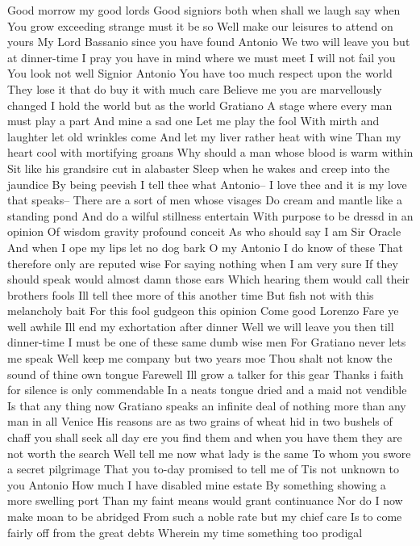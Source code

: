 Good morrow my good lords
Good signiors both when shall we laugh say when
You grow exceeding strange must it be so
Well make our leisures to attend on yours
My Lord Bassanio since you have found Antonio
We two will leave you but at dinner-time
I pray you have in mind where we must meet
I will not fail you
You look not well Signior Antonio
You have too much respect upon the world
They lose it that do buy it with much care
Believe me you are marvellously changed
I hold the world but as the world Gratiano
A stage where every man must play a part
And mine a sad one
Let me play the fool
With mirth and laughter let old wrinkles come
And let my liver rather heat with wine
Than my heart cool with mortifying groans
Why should a man whose blood is warm within
Sit like his grandsire cut in alabaster
Sleep when he wakes and creep into the jaundice
By being peevish I tell thee what Antonio--
I love thee and it is my love that speaks--
There are a sort of men whose visages
Do cream and mantle like a standing pond
And do a wilful stillness entertain
With purpose to be dressd in an opinion
Of wisdom gravity profound conceit
As who should say I am Sir Oracle
And when I ope my lips let no dog bark
O my Antonio I do know of these
That therefore only are reputed wise
For saying nothing when I am very sure
If they should speak would almost damn those ears
Which hearing them would call their brothers fools
Ill tell thee more of this another time
But fish not with this melancholy bait
For this fool gudgeon this opinion
Come good Lorenzo Fare ye well awhile
Ill end my exhortation after dinner
Well we will leave you then till dinner-time
I must be one of these same dumb wise men
For Gratiano never lets me speak
Well keep me company but two years moe
Thou shalt not know the sound of thine own tongue
Farewell Ill grow a talker for this gear
Thanks i faith for silence is only commendable
In a neats tongue dried and a maid not vendible
Is that any thing now
Gratiano speaks an infinite deal of nothing more
than any man in all Venice His reasons are as two
grains of wheat hid in two bushels of chaff you
shall seek all day ere you find them and when you
have them they are not worth the search
Well tell me now what lady is the same
To whom you swore a secret pilgrimage
That you to-day promised to tell me of
Tis not unknown to you Antonio
How much I have disabled mine estate
By something showing a more swelling port
Than my faint means would grant continuance
Nor do I now make moan to be abridged
From such a noble rate but my chief care
Is to come fairly off from the great debts
Wherein my time something too prodigal
